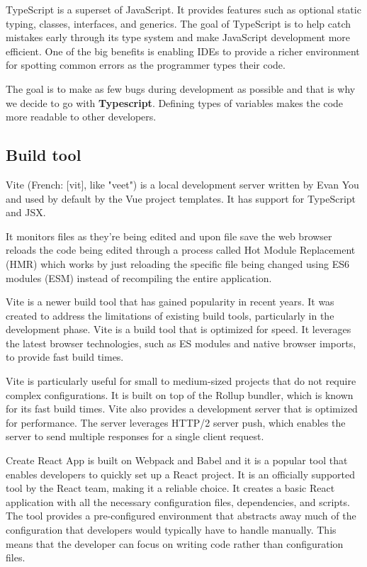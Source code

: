   TypeScript is a superset of JavaScript. 
  It provides features such as optional static typing, classes, interfaces, and generics. 
  The goal of TypeScript is to help catch mistakes early through its type system and make JavaScript development more efficient. 
  One of the big benefits is enabling IDEs to provide a richer environment for spotting common errors as the programmer types their code.

  The goal is to make as few bugs during development as possible and that is why we decide to go with \textbf{Typescript}.
  Defining types of variables makes the code more readable to other developers.

\subsection{Build tool}

  Vite (French: [vit], like "veet") is a local development server written by Evan You and used by default by the Vue project templates. It has support for TypeScript and JSX.

  It monitors files as they're being edited and upon file save the web browser reloads the code being edited through a process called Hot Module Replacement (HMR) which works by just reloading the specific file being changed using ES6 modules (ESM) instead of recompiling the entire application.

  Vite is a newer build tool that has gained popularity in recent years. It was created to address the limitations of existing build tools, particularly in the development phase. Vite is a build tool that is optimized for speed. It leverages the latest browser technologies, such as ES modules and native browser imports, to provide fast build times.

  Vite is particularly useful for small to medium-sized projects that do not require complex configurations. It is built on top of the Rollup bundler, which is known for its fast build times. Vite also provides a development server that is optimized for performance. The server leverages HTTP/2 server push, which enables the server to send multiple responses for a single client request.

  Create React App is built on Webpack and Babel and it is a popular tool that enables developers to quickly set up a React project. It is an officially supported tool by the React team, making it a reliable choice. It creates a basic React application with all the necessary configuration files, dependencies, and scripts. The tool provides a pre-configured environment that abstracts away much of the configuration that developers would typically have to handle manually. This means that the developer can focus on writing code rather than configuration files.

